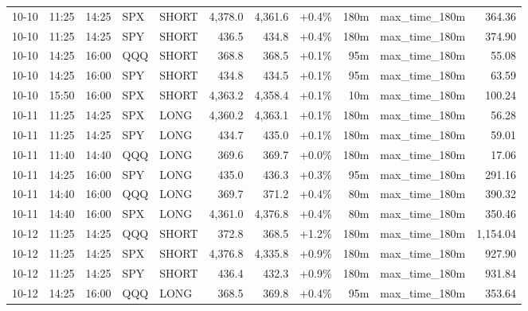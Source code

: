 \documentclass[11pt,a4paper,twoside]{article}
\begin{document}
\begin{center}
\begin{longtable}{>{\color{txtmain}}l l l l l r r r r >{\color{txtmain}}l r}
10-10 & 11:25 & 14:25 & SPX & SHORT & 4,378.0 & 4,361.6 & \textcolor{wingreen}{+0.4\%} & 180m & max\_time\_180m & \textcolor{wingreen}{364.36} \\
10-10 & 11:25 & 14:25 & SPY & SHORT & 436.5 & 434.8 & \textcolor{wingreen}{+0.4\%} & 180m & max\_time\_180m & \textcolor{wingreen}{374.90} \\
10-10 & 14:25 & 16:00 & QQQ & SHORT & 368.8 & 368.5 & \textcolor{wingreen}{+0.1\%} & 95m & max\_time\_180m & \textcolor{wingreen}{55.08} \\
10-10 & 14:25 & 16:00 & SPY & SHORT & 434.8 & 434.5 & \textcolor{wingreen}{+0.1\%} & 95m & max\_time\_180m & \textcolor{wingreen}{63.59} \\
10-10 & 15:50 & 16:00 & SPX & SHORT & 4,363.2 & 4,358.4 & \textcolor{wingreen}{+0.1\%} & 10m & max\_time\_180m & \textcolor{wingreen}{100.24} \\
10-11 & 11:25 & 14:25 & SPX & LONG & 4,360.2 & 4,363.1 & \textcolor{wingreen}{+0.1\%} & 180m & max\_time\_180m & \textcolor{wingreen}{56.28} \\
10-11 & 11:25 & 14:25 & SPY & LONG & 434.7 & 435.0 & \textcolor{wingreen}{+0.1\%} & 180m & max\_time\_180m & \textcolor{wingreen}{59.01} \\
10-11 & 11:40 & 14:40 & QQQ & LONG & 369.6 & 369.7 & \textcolor{wingreen}{+0.0\%} & 180m & max\_time\_180m & \textcolor{wingreen}{17.06} \\
10-11 & 14:25 & 16:00 & SPY & LONG & 435.0 & 436.3 & \textcolor{wingreen}{+0.3\%} & 95m & max\_time\_180m & \textcolor{wingreen}{291.16} \\
10-11 & 14:40 & 16:00 & QQQ & LONG & 369.7 & 371.2 & \textcolor{wingreen}{+0.4\%} & 80m & max\_time\_180m & \textcolor{wingreen}{390.32} \\
10-11 & 14:40 & 16:00 & SPX & LONG & 4,361.0 & 4,376.8 & \textcolor{wingreen}{+0.4\%} & 80m & max\_time\_180m & \textcolor{wingreen}{350.46} \\
10-12 & 11:25 & 14:25 & QQQ & SHORT & 372.8 & 368.5 & \textcolor{wingreen}{+1.2\%} & 180m & max\_time\_180m & \textcolor{wingreen}{1,154.04} \\
10-12 & 11:25 & 14:25 & SPX & SHORT & 4,376.8 & 4,335.8 & \textcolor{wingreen}{+0.9\%} & 180m & max\_time\_180m & \textcolor{wingreen}{927.90} \\
10-12 & 11:25 & 14:25 & SPY & SHORT & 436.4 & 432.3 & \textcolor{wingreen}{+0.9\%} & 180m & max\_time\_180m & \textcolor{wingreen}{931.84} \\
10-12 & 14:25 & 16:00 & QQQ & LONG & 368.5 & 369.8 & \textcolor{wingreen}{+0.4\%} & 95m & max\_time\_180m & \textcolor{wingreen}{353.64} \\

\end{longtable}
\end{center}
\end{document}
